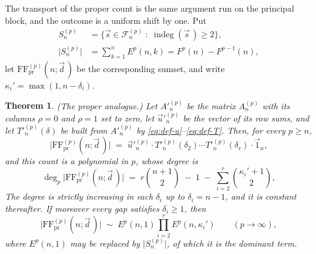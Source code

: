 \documentclass[11pt, a4paper, abstract=yes]{scrartcl}
\theoremstyle{definition}
\theoremstyle{remark}
\theoremstyle{plain}
\newtheorem{theorem}[definition]{Theorem}
\newcommand{\indeg}{\operatorname{indeg}}
\begin{document}
The transport of the proper count is the same argument run on the principal block, and the outcome
is a uniform shift by one. Put
\begin{align}
  S_n^{(p)} &= \bigl\lbrace\vec s\in\mathcal F_n^{(p)}\;:\;\indeg(\vec s\,)\ge2\bigr\rbrace,\label{eq:def-Snp}\\
  \lvert S_n^{(p)}\rvert &= \sum_{k=1}^{n}E^p(n,k)=F^p(n)-F^{p-1}(n) ,\label{eq:card-Snp}
\end{align}
let \(\mathrm{FF}^{(p)}_{\mathrm{pr}}(n;\vec d\,)\) be the corresponding sumset, and write
\(\kappa_i'=\max(1,n-\delta_i)\).

\begin{theorem}
(\emph{The proper analogue.}) Let \(A'^{(p)}_n\) be the matrix \(A^{(p)}_n\) with its columns \(\rho=0\)
and \(\rho=1\) set to zero, let \(\vec u'^{(p)}_n\) be the vector of its row sums, and let
\(T'^{(p)}_n(\delta)\) be built from \(A'^{(p)}_n\) by \eqref{eq:def-u}--\eqref{eq:def-T}. Then, for every
\(p\ge n\),
\begin{equation}\label{eq:proper-p-product}
  \lvert\mathrm{FF}^{(p)}_{\mathrm{pr}}(n;\vec d\,)\rvert
  \;=\;\vec u'^{(p)}_n\cdot T'^{(p)}_n(\delta_2)\cdots T'^{(p)}_n(\delta_r)\cdot\vec 1_n ,
\end{equation}
and this count is a polynomial in \(p\), whose degree is
\begin{equation}\label{eq:proper-degree-in-p}
  \deg_p\lvert\mathrm{FF}^{(p)}_{\mathrm{pr}}(n;\vec d\,)\rvert
   \;=\; r\binom{n+1}{2}\;-\;1\;-\;\sum_{i=2}^{r}\binom{\kappa_i'+1}{2},
\end{equation}
The degree is strictly increasing in each \(\delta_i\) up to \(\delta_i=n-1\), and it is constant
thereafter. If moreover every gap satisfies \(\delta_i\ge1\), then
\begin{equation}\label{eq:proper-lc-in-p}
  \lvert\mathrm{FF}^{(p)}_{\mathrm{pr}}(n;\vec d\,)\rvert\;\sim\;E^p(n,1)\prod_{i=2}^{r}E^p(n,\kappa_i')
  \qquad(p\to\infty),
\end{equation}
where \(E^p(n,1)\) may be replaced by \(\lvert S_n^{(p)}\rvert\), of which it is the dominant term.
\label{thm-asymptotics-p-proper}
\end{theorem}
\end{document}
